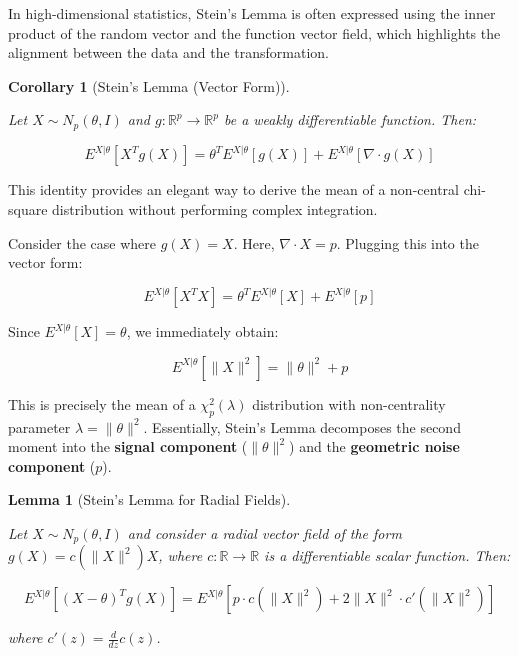 \documentclass[
  letterpaper,
  DIV=11,
  numbers=noendperiod]{scrreprt}
\renewcommand{\[}{\begin{equation}}
\renewcommand{\]}{\end{equation}}
\theoremstyle{definition}
\theoremstyle{plain}
\theoremstyle{plain}
\newtheorem{corollary}{Corollary}[chapter]
\theoremstyle{plain}
\theoremstyle{definition}
\theoremstyle{plain}
\newtheorem{lemma}{Lemma}[chapter]
\theoremstyle{remark}
\begin{document}
In high-dimensional statistics, Stein's Lemma is often expressed using
the inner product of the random vector and the function vector field,
which highlights the alignment between the data and the transformation.

\begin{corollary}[Stein's Lemma (Vector
Form)]\protect\hypertarget{cor-stein-vector}{}\label{cor-stein-vector}

Let \(X \sim N_p(\theta, I)\) and \(g: \mathbb{R}^p \to \mathbb{R}^p\)
be a weakly differentiable function. Then:

\[
E^{X|\theta} [ X^T g(X) ] = \theta^T E^{X|\theta} [ g(X) ] + E^{X|\theta} [ \nabla \cdot g(X) ]
\]

\end{corollary}

\begin{tcolorbox}[enhanced jigsaw, toptitle=1mm, arc=.35mm, left=2mm, toprule=.15mm, bottomtitle=1mm, opacityback=0, rightrule=.15mm, title=\textcolor{quarto-callout-tip-color}{\faLightbulb}\hspace{0.5em}{Remark: Connection to Non-Central \(\chi^2\) Moments}, colback=white, coltitle=black, titlerule=0mm, colbacktitle=quarto-callout-tip-color!10!white, breakable, leftrule=.75mm, bottomrule=.15mm, opacitybacktitle=0.6, colframe=quarto-callout-tip-color-frame]

This identity provides an elegant way to derive the mean of a
non-central chi-square distribution without performing complex
integration.

Consider the case where \(g(X) = X\). Here, \(\nabla \cdot X = p\).
Plugging this into the vector form:

\[
E^{X|\theta} [ X^T X ] = \theta^T E^{X|\theta} [ X ] + E^{X|\theta} [ p ]
\]

Since \(E^{X|\theta} [ X ] = \theta\), we immediately obtain:

\[
E^{X|\theta} [ \lVert X \rVert^2 ] = \lVert \theta \rVert^2 + p
\]

This is precisely the mean of a \(\chi^2_p(\lambda)\) distribution with
non-centrality parameter \(\lambda = \lVert \theta \rVert^2\).
Essentially, Stein's Lemma decomposes the second moment into the
\textbf{signal component} (\(\lVert \theta \rVert^2\)) and the
\textbf{geometric noise component} (\(p\)).

\end{tcolorbox}

\begin{lemma}[Stein's Lemma for Radial
Fields]\protect\hypertarget{lem-stein-radial}{}\label{lem-stein-radial}

Let \(X \sim N_p(\theta, I)\) and consider a radial vector field of the
form \(g(X) = c(\lVert X \rVert^2)X\), where
\(c: \mathbb{R} \to \mathbb{R}\) is a differentiable scalar function.
Then:

\[
E^{X|\theta} \left[ (X - \theta)^T g(X) \right] = E^{X|\theta} \left[ p \cdot c(\lVert X \rVert^2) + 2 \lVert X \rVert^2 \cdot c'(\lVert X \rVert^2) \right]
\]

where \(c'(z) = \frac{d}{dz}c(z)\).

\end{lemma}
\end{document}
